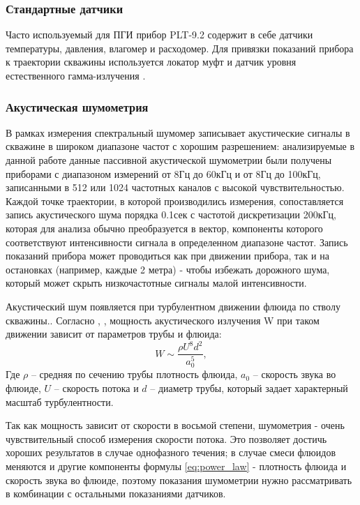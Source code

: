 \subsubsection{Стандартные датчики}
\par
Часто используемый для ПГИ прибор PLT-9.2 \cite{92} содержит в себе датчики температуры, давления, влагомер и расходомер. Для привязки показаний прибора к траектории скважины используется локатор муфт и датчик уровня естественного гамма-излучения \cite{169255}.

\subsubsection{Акустическая шумометрия}
\par
В рамках измерения спектральный шумомер записывает акустические сигналы в скважине в широком диапазоне частот с хорошим разрешением: анализируемые в данной работе данные пассивной акустической шумометрии были получены приборами с диапазоном измерений от 8Гц до 60кГц и от 8Гц до 100кГц, записанными в 512 или 1024 частотных каналов с высокой чувствительностью. Каждой точке траектории, в которой производились измерения, сопоставляется запись акустического шума порядка 0.1сек с частотой дискретизации 200кГц, которая для анализа обычно преобразуется в вектор, компоненты которого соответствуют интенсивности сигнала в определенном диапазоне частот. Запись показаний прибора может проводиться как при движении прибора, так и на остановках (например, каждые 2 метра) - чтобы избежать дорожного шума, который может скрыть низкочастотные сигналы малой интенсивности.
\par
Акустический шум появляется при турбулентном движении флюида по стволу скважины.. Согласно \cite{lighthill}, \cite{191562}, мощность акустического излучения W при таком движении зависит от параметров трубы и флюида:
\begin{equation}
\label{eq:power_law}
    W\sim\frac{\rho U^8 d^2}{a_0^5},
\end{equation}
Где $\rho$ – средняя по сечению трубы плотность флюида, $a_0$ – скорость звука во флюиде, $U$ – скорость потока и $d$ – диаметр трубы, который задает характерный масштаб турбулентности.
\par
Так как мощность зависит от скорости в восьмой степени, шумометрия - очень чувствительный способ измерения скорости потока. Это позволяет достичь хороших результатов в случае однофазного течения; в случае смеси флюидов меняются и другие компоненты формулы \eqref{eq:power_law} - плотность флюида и скорость звука во флюиде, поэтому показания шумометрии нужно рассматривать в комбинации с остальными показаниями датчиков.
